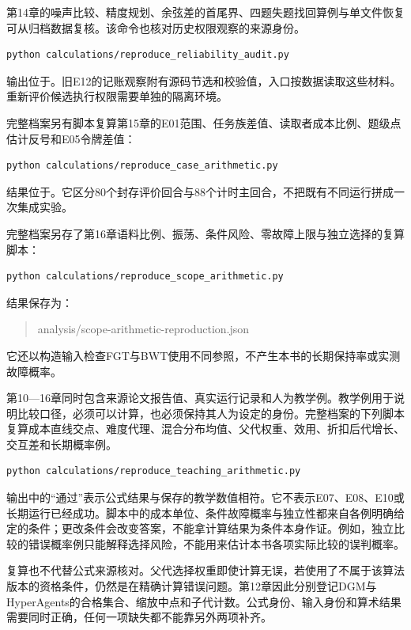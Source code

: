 第14章的噪声比较、精度规划、余弦差的首尾界、四题失题找回算例与单文件恢复可从归档数据复核。该命令也核对历史权限观察的来源身份。
\begin{verbatim}
python calculations/reproduce_reliability_audit.py
\end{verbatim}
输出位于\allowbreak{}。旧E12的记账观察附有源码节选和校验值，入口按数据读取这些材料。重新评价候选执行权限需要单独的隔离环境。

完整档案另有脚本复算第15章的E01范围、任务族差值、读取者成本比例、题级点估计反号和E05令牌差值：
\begin{verbatim}
python calculations/reproduce_case_arithmetic.py
\end{verbatim}
结果位于\allowbreak{}。它区分80个封存评价回合与88个计时主回合，不把既有不同运行拼成一次集成实验。

完整档案另存了第16章语料比例、振荡、条件风险、零故障上限与独立选择的复算脚本：
\begin{verbatim}
python calculations/reproduce_scope_arithmetic.py
\end{verbatim}
结果保存为：
\begin{quote}\ttfamily
analysis/\allowbreak scope-arithmetic-reproduction.json
\end{quote}
它还以构造输入检查FGT与BWT使用不同参照，不产生本书的长期保持率或实测故障概率。

第10—16章同时包含来源论文报告值、真实运行记录和人为教学例。教学例用于说明比较口径，必须可以计算，也必须保持其人为设定的身份。完整档案的下列脚本复算成本直线交点、难度代理、混合分布均值、父代权重、效用、折扣后代增长、交互差和长期概率例。

\begin{verbatim}
python calculations/reproduce_teaching_arithmetic.py
\end{verbatim}

输出中的“通过”表示公式结果与保存的教学数值相符。它不表示E07、E08、E10或长期运行已经成功。脚本中的成本单位、条件故障概率与独立性都来自各例明确给定的条件；更改条件会改变答案，不能拿计算结果为条件本身作证。例如，独立比较的错误概率例只能解释选择风险，不能用来估计本书各项实际比较的误判概率。

复算也不代替公式来源核对。父代选择权重即使计算无误，若使用了不属于该算法版本的资格条件，仍然是在精确计算错误问题。第12章因此分别登记DGM与HyperAgents的合格集合、缩放中点和子代计数。公式身份、输入身份和算术结果需要同时正确，任何一项缺失都不能靠另外两项补齐。

